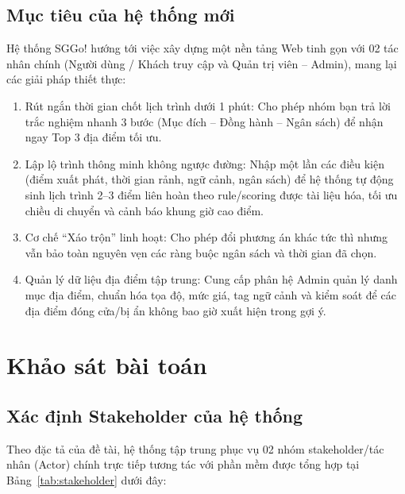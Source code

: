 \documentclass[13pt,a4paper]{extreport}
\begin{document}
\subsection{Mục tiêu của hệ thống mới}
Hệ thống SGGo! hướng tới việc xây dựng một nền tảng Web tinh gọn với 02 tác nhân chính (Người dùng / Khách truy cập và Quản trị viên -- Admin), mang lại các giải pháp thiết thực:
\begin{enumerate}
    \item Rút ngắn thời gian chốt lịch trình dưới 1 phút: Cho phép nhóm bạn trả lời trắc nghiệm nhanh 3 bước (Mục đích -- Đồng hành -- Ngân sách) để nhận ngay Top 3 địa điểm tối ưu.
    \item Lập lộ trình thông minh không ngược đường: Nhập một lần các điều kiện (điểm xuất phát, thời gian rảnh, ngữ cảnh, ngân sách) để hệ thống tự động sinh lịch trình 2--3 điểm liên hoàn theo rule/scoring được tài liệu hóa, tối ưu chiều di chuyển và cảnh báo khung giờ cao điểm.
    \item Cơ chế ``Xáo trộn'' linh hoạt: Cho phép đổi phương án khác tức thì nhưng vẫn bảo toàn nguyên vẹn các ràng buộc ngân sách và thời gian đã chọn.
    \item Quản lý dữ liệu địa điểm tập trung: Cung cấp phân hệ Admin quản lý danh mục địa điểm, chuẩn hóa tọa độ, mức giá, tag ngữ cảnh và kiểm soát để các địa điểm đóng cửa/bị ẩn không bao giờ xuất hiện trong gợi ý.
\end{enumerate}

\section{Khảo sát bài toán}

\subsection{Xác định Stakeholder của hệ thống}
Theo đặc tả của đề tài, hệ thống tập trung phục vụ 02 nhóm stakeholder/tác nhân (Actor) chính trực tiếp tương tác với phần mềm được tổng hợp tại Bảng~\ref{tab:stakeholder} dưới đây:
\end{document}
